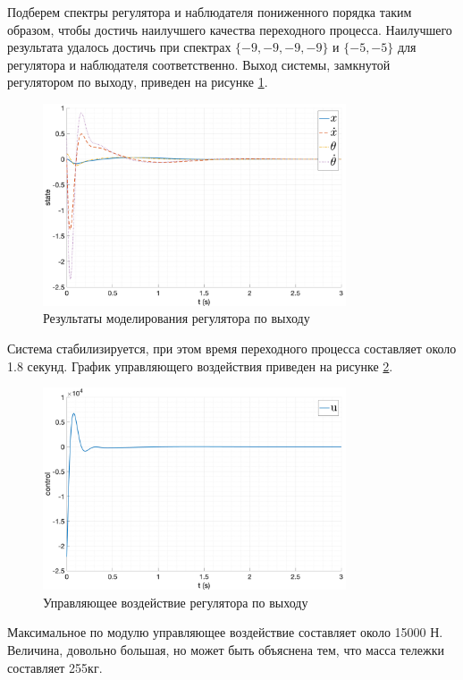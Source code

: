 Подберем спектры регулятора и наблюдателя пониженного порядка таким образом, чтобы 
достичь наилучшего качества переходного процесса. Наилучшего результата удалось достичь при
спектрах $\{-9, -9, -9, -9\}$ и $\{-5, -5\}$ для регулятора и наблюдателя соответственно. 
Выход системы, замкнутой регулятором по выходу, приведен на рисунке \ref{fig:modal_controller_obderver_out}.
\begin{figure}[ht!]
    \centering
    \includegraphics[width=0.8\textwidth]{media/plots/observer_controller/observer_controller_state.png}
    \caption{Результаты моделирования регулятора по выходу}
    \label{fig:modal_controller_obderver_out}
\end{figure}

Система стабилизируется, при этом время переходного процесса составляет около 1.8 секунд. 
График управляющего воздействия приведен на рисунке \ref{fig:modal_controller_obderver_u}.
\begin{figure}[ht!]
    \centering
    \includegraphics[width=0.8\textwidth]{media/plots/observer_controller/observer_controller_u.png}
    \caption{Управляющее воздействие регулятора по выходу}
    \label{fig:modal_controller_obderver_u}
\end{figure}
Максимальное по модулю управляющее воздействие составляет около 15000 Н. Величина, довольно большая, 
но может быть объяснена тем, что масса тележки составляет 255кг. 

